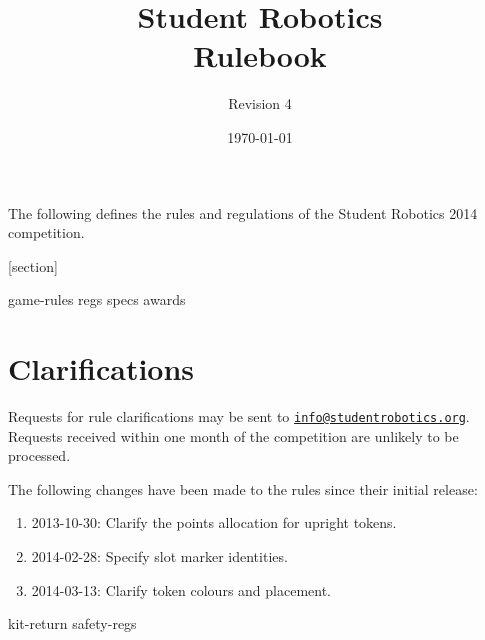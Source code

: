 \documentclass[a4paper, 11pt]{scrartcl}
\title {Student Robotics \sryear\\ Rulebook}
\author{Revision 4}
\date{\today}
\newcommand{\sryear}{2014}
\begin{document}
\maketitle

\noindent The following defines the rules and regulations of the Student Robotics \sryear {} competition.

[section]
\newcommand{\rcn}{\stepcounter{rule}\arabic{section}.\arabic{rule}}
\renewcommand{\labelenumi}{\rcn}

 {game-rules}
\newpage
 {regs}
\newpage
 {specs}
\newpage
 {awards}

\renewcommand{\labelenumi}{\rcn}

\section{Clarifications}
Requests for rule clarifications may be sent to \href{mailto:info@studentrobotics.org}{\nolinkurl{info@studentrobotics.org}}.
Requests received within one month of the competition are unlikely to be processed.

The following changes have been made to the rules since their initial release:

\begin{enumerate}
  \item 2013-10-30: Clarify the points allocation for upright tokens.
  \item 2014-02-28: Specify slot marker identities.
  \item 2014-03-13: Clarify token colours and placement.
\end{enumerate}

\newpage
\appendix
\appendixpage
\addappheadtotoc
 {kit-return}
 {safety-regs}
\end{document}

